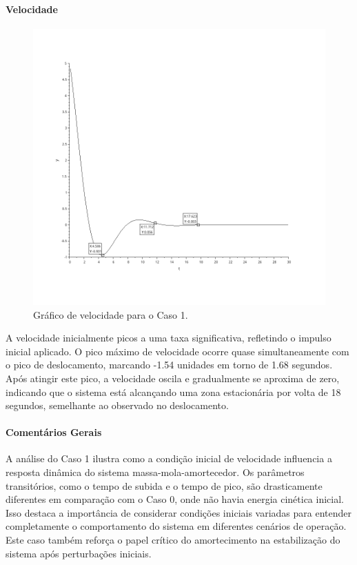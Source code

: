 \paragraph{Velocidade}
\begin{figure}[H]
    \centering
    \includegraphics[height=0.7\textwidth]{atividades/2-atividade/assets/velocidade-caso-1.png}
    \caption{Gráfico de velocidade para o Caso 1.}
\end{figure}
A velocidade inicialmente picos a uma taxa significativa, refletindo o impulso inicial aplicado. O pico máximo de velocidade ocorre quase simultaneamente com o pico de deslocamento, marcando -1.54 unidades em torno de 1.68 segundos. Após atingir este pico, a velocidade oscila e gradualmente se aproxima de zero, indicando que o sistema está alcançando uma zona estacionária por volta de 18 segundos, semelhante ao observado no deslocamento.


\paragraph{Comentários Gerais}
A análise do Caso 1 ilustra como a condição inicial de velocidade influencia a resposta dinâmica do sistema massa-mola-amortecedor. Os parâmetros transitórios, como o tempo de subida e o tempo de pico, são drasticamente diferentes em comparação com o Caso 0, onde não havia energia cinética inicial. Isso destaca a importância de considerar condições iniciais variadas para entender completamente o comportamento do sistema em diferentes cenários de operação. Este caso também reforça o papel crítico do amortecimento na estabilização do sistema após perturbações iniciais.


